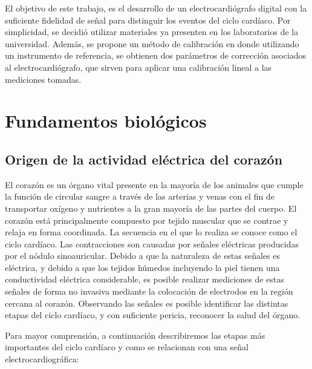 \documentclass[conference]{IEEEtran}
\begin{document}
 
El objetivo de este trabajo, es el desarrollo de un electrocardiógrafo digital
con la suficiente fidelidad de señal para distinguir los eventos del ciclo
cardíaco. Por simplicidad, se decidió utilizar materiales ya presenten en los
laboratorios de la universidad. Además, se propone un método de calibración en
donde utilizando un instrumento de referencia, se obtienen dos parámetros de
corrección asociados al electrocardiógrafo, que sirven para aplicar una
calibración lineal a las mediciones tomadas.

\section{Fundamentos biológicos}

\subsection{Origen de la actividad eléctrica del corazón}

El corazón es un órgano vital presente en la mayoría de los animales que cumple
la función de circular sangre a través de las arterias y venas con el fin de
transportar oxígeno y nutrientes a la gran mayoría de las partes del cuerpo.
El corazón está principalmente compuesto por tejido muscular que se contrae y
relaja en forma coordinada. La secuencia en el que lo realiza se conoce como el
ciclo cardíaco. Las contracciones son causadas por señales eléctricas producidas
por el nódulo sinoauricular. Debido a que la naturaleza de estas señales es
eléctrica, y debido a que los tejidos húmedos incluyendo la piel tienen una
conductividad eléctrica considerable, es posible realizar mediciones de estas
señales de forma no invasiva mediante la colocación de electrodos en la región
cercana al corazón. Observando las señales es posible identificar las distintas
etapas del ciclo cardíaco, y con suficiente pericia, reconocer la salud del
órgano.


Para mayor comprensión, a continuación describiremos las etapas más importantes
del ciclo cardíaco y como se relacionan con una señal electrocardiográfica:
\cite{ecg_workings}
\end{document}
